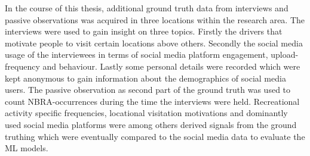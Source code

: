 In the course of this thesis, additional ground truth data from interviews and passive observations was acquired in three locations within the research area. The interviews were used to gain insight on three topics. Firstly the drivers that motivate people to visit certain locations above others. Secondly the social media usage of the interviewees in terms of social media platform engagement, upload-frequency and behaviour. Lastly some personal details were recorded which were kept anonymous to gain information about the demographics of social media users. The passive observation as second part of the ground truth was used to count NBRA-occurrences during the time the interviews were held. Recreational activity specific frequencies, locational visitation motivations and dominantly used social media platforms were among others derived signals from the ground truthing which were eventually compared to the social media data to evaluate the ML models.

